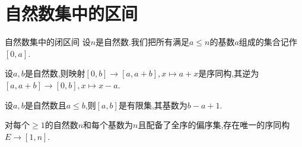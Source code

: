 \section{自然数集中的区间}

\begin{definition}{自然数集中的闭区间}{}
	设$n$是自然数.我们把所有满足$a\leq n$的基数$a$组成的集合记作$\left[0,a\right]$.
\end{definition}

\begin{proposition}{}{}
	设$a,b$是自然数,则映射$\left[0,b\right]\to\left[a,a+b\right],x\mapsto a+x$是序同构,其逆为$\left[a,a+b\right]\to\left[0,b\right],x\mapsto x-a$.
\end{proposition}

\begin{proposition}{}{}
	设$a,b$是自然数且$a\leq b$,则$\left[a,b\right]$是有限集,其基数为$b-a+1$.
\end{proposition}

\begin{proposition}{}{}
	对每个$\geq 1$的自然数$n$和每个基数为$n$且配备了全序的偏序集,存在唯一的序同构$E\to\left[1,n\right]$.
\end{proposition}



























